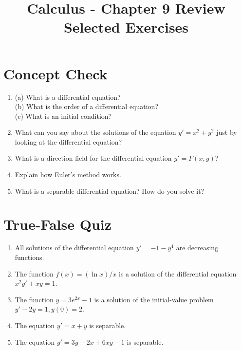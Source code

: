 \documentclass[12pt, a4paper]{article}
\title{Calculus - Chapter 9 Review Selected Exercises}
\author{}
\date{}
\begin{document}
\maketitle
\hrulefill
\vspace{1em}

\section*{Concept Check}
\begin{enumerate}
    \item (a) What is a differential equation? \\
          (b) What is the order of a differential equation? \\
          (c) What is an initial condition?

    \item What can you say about the solutions of the equation $y' = x^2 + y^2$ just by looking at the differential equation?

    \item What is a direction field for the differential equation $y' = F(x,y)$?

    \item Explain how Euler's method works.

    \item What is a separable differential equation? How do you solve it?
\end{enumerate}

\hrulefill
\vspace{1em}

\section*{True-False Quiz}
\begin{enumerate}
    \item All solutions of the differential equation $y' = -1 - y^4$ are decreasing functions.

    \item The function $f(x) = (\ln x)/x$ is a solution of the differential equation $x^2y' + xy = 1$.

    \item The function $y = 3e^{2x} - 1$ is a solution of the initial-value problem $y' - 2y = 1, y(0)=2$.

    \item The equation $y' = x+y$ is separable.
    
    \item The equation $y' = 3y - 2x + 6xy - 1$ is separable.
\end{enumerate}
\end{document}

